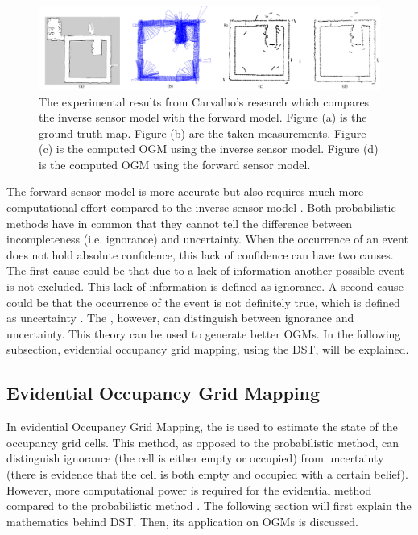 \begin{figure}[h!]
	\centering
	\includegraphics[width=1\linewidth]{Figures/Occupancy_Grid_Map/OGM_inverse_forward_compare}
	\caption{The experimental results from Carvalho's research \cite{carvalho2013comparative} which compares the inverse sensor model with the forward model. Figure (a) is the ground truth map. Figure (b) are the taken measurements. Figure (c) is the computed \gls{OGM} using the inverse sensor model. Figure (d) is the computed \gls{OGM} using the forward sensor model.}
	\label{fig:OGM_inv_for_comp}
\end{figure}

The forward sensor model is more accurate but also requires much more computational effort compared to the inverse sensor model \cite{carvalho2013comparative}. Both probabilistic methods have in common that they cannot tell the difference between incompleteness (i.e. ignorance) and uncertainty. When the occurrence of an event does not hold absolute confidence, this lack of confidence can have two causes. The first cause could be that due to a lack of information another possible event is not excluded. This lack of information is defined as ignorance. A second cause could be that the occurrence of the event is not definitely true, which is defined as uncertainty \cite{liu2001propositional}.
The  \cite{dempster1967upper} \cite{shafer1976mathematical}, however, can distinguish between ignorance and uncertainty. This theory can be used to generate better \glspl{OGM}. In the following subsection, evidential occupancy grid mapping, using the \gls{DST}, will be explained.


\subsection{Evidential Occupancy Grid Mapping} \label{subsec:evid_OGM}
In evidential Occupancy Grid Mapping, the  is used to estimate the state of the occupancy grid cells. This method, as opposed to the probabilistic method, can distinguish ignorance (the cell is either empty or occupied) from uncertainty (there is evidence that the cell is both empty and occupied with a certain belief). However, more computational power is required for the evidential method compared to the probabilistic method \cite{moras2014evidential}. The following section will first explain the mathematics behind \gls{DST}. Then, its application on \glspl{OGM} is discussed. 


